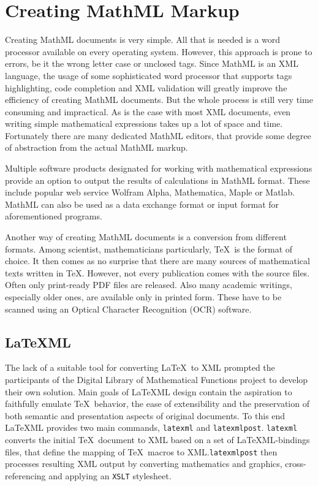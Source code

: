 \documentclass[11pt,oneside,final]{fithesis2}
\begin{document}
\section{Creating MathML Markup}
\label{sec:create-mathml}
Creating MathML documents is very simple. All that is needed is a word processor available on every operating system. However, this approach is prone to errors, be it the wrong letter case or unclosed tags. Since MathML is an XML language, the usage of some sophisticated word processor that supports tags highlighting, code completion and XML validation will greatly improve the efficiency of creating MathML documents. But the whole process is still very time consuming and impractical. As is the case with most XML documents, even writing simple mathematical expressions takes up a lot of space and time. Fortunately there are many dedicated MathML editors, that provide some degree of abstraction from the actual MathML markup.

Multiple software products designated for working with mathematical expressions provide an option to output the results of calculations in MathML format. These include popular web service Wolfram Alpha, Mathematica, Maple or Matlab. MathML can also be used as a data exchange format or input format for aforementioned programs.

Another way of creating MathML documents is a conversion from different formats. Among scientist, mathematicians particularly, \TeX\ is the format of choice. It then comes as no surprise that there are many sources of mathematical texts written in \TeX. However, not every publication comes with the source files. Often only print-ready PDF files are released. Also many academic writings, especially older ones, are available only in printed form. These have to be scanned using an Optical Character Recognition (OCR) software. 

\subsection{\LaTeX ML}
The lack of a suitable tool for converting \LaTeX\ to XML prompted the participants of the Digital Library of Mathematical Functions project to develop their own solution. Main goals of \LaTeX ML design contain the aspiration to faithfully emulate \TeX\ behavior, the ease of extensibility and the preservation of both semantic and presentation aspects of original documents. To this end \LaTeX ML provides two main commands, \texttt{latexml} and \texttt{latexmlpost}. \texttt{latexml} converts the initial \TeX\ document to XML based on a set of \LaTeX ML-bindings files, that define the mapping of \TeX\ macros to XML.\texttt{latexmlpost} then processes resulting XML output by converting mathematics
and graphics, cross-referencing and applying an \texttt{XSLT} stylesheet. 
\end{document}
